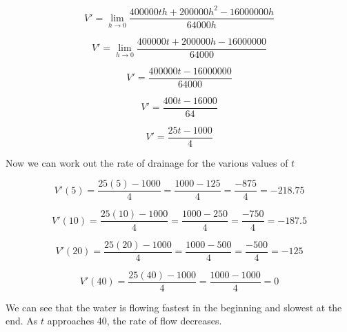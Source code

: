 \documentclass{article}
\begin{document}
\begin{enumerate}
	$$V' = \lim _{h \to 0} \frac{400000th + 200000h^2 - 16000000h}{64000h}$$

	$$V' = \lim _{h \to 0} \frac{400000t + 200000h - 16000000}{64000}$$

	$$V' = \frac{400000t - 16000000}{64000}$$

	$$V' = \frac{400t - 16000}{64}$$

	$$V' = \frac{25t - 1000}{4}$$

	Now we can work out the rate of drainage for the various values of $t$

	$$V'(5) = \frac{25(5) - 1000}{4} = \frac{1000 - 125}{4} = \frac{-875}{4} = - 218.75$$

	$$V'(10) = \frac{25(10) - 1000}{4} = \frac{1000 - 250}{4} = \frac{-750}{4} = - 187.5$$

	$$V'(20) = \frac{25(20) - 1000}{4} = \frac{1000 - 500}{4} = \frac{-500}{4} = - 125$$

	$$V'(40) = \frac{25(40) - 1000}{4} = \frac{1000 - 1000}{4} = 0$$

	We can see that the water is flowing fastest in the beginning and slowest at the end. As
	$t$ approaches 40, the rate of flow decreases.

	\end{enumerate}	
\end{document}
